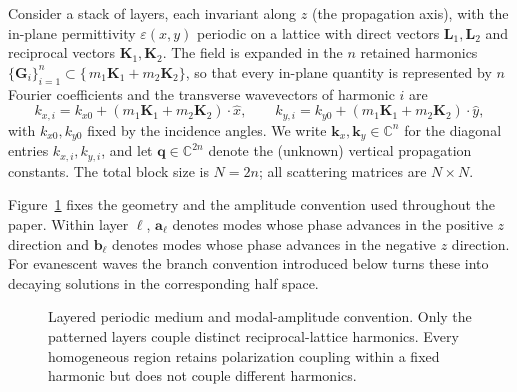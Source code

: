 \documentclass[11pt]{article}
\theoremstyle{remark}
\newcommand{\CC}{\mathbb{C}}
\newcommand{\eps}{\varepsilon}
\newcommand{\kk}{\mathbf{k}}
\newcommand{\fq}{\mathbf{q}}
\newcommand{\fa}{\mathbf{a}}
\newcommand{\fb}{\mathbf{b}}
\begin{document}
Consider a stack of layers, each invariant along $z$ (the propagation axis),
with the in-plane permittivity $\varepsilon(x,y)$ periodic on a lattice with
direct vectors $\mathbf{L}_1,\mathbf{L}_2$ and reciprocal vectors
$\mathbf{K}_1,\mathbf{K}_2$. The field is expanded in the $n$ retained
harmonics
$\{\mathbf{G}_i\}_{i=1}^{n}\subset\{\,m_1\mathbf{K}_1+m_2\mathbf{K}_2\}$,
so that every in-plane quantity is represented by $n$ Fourier coefficients and
the transverse wavevectors of harmonic $i$ are
\begin{equation}
k_{x,i}=k_{x0}+(m_1\mathbf{K}_1+m_2\mathbf{K}_2)\cdot\hat x,\qquad
k_{y,i}=k_{y0}+(m_1\mathbf{K}_1+m_2\mathbf{K}_2)\cdot\hat y,
\label{eq:ks}
\end{equation}
with $k_{x0},k_{y0}$ fixed by the incidence angles. We write
$\kk_x,\kk_y\in\CC^n$ for the diagonal entries $k_{x,i},k_{y,i}$, and let
$\fq\in\CC^{2n}$ denote the (unknown) vertical propagation constants. The total
block size is $N=2n$; all scattering matrices are $N\times N$.

Figure~\ref{fig:geometry} fixes the geometry and the amplitude convention used
throughout the paper.  Within layer $\ell$, $\fa_\ell$ denotes modes whose
phase advances in the positive $z$ direction and $\fb_\ell$ denotes modes
whose phase advances in the negative $z$ direction.  For evanescent waves the
branch convention introduced below turns these into decaying solutions in the
corresponding half space.

\begin{figure}[t]
\centering
{}
\caption{Layered periodic medium and modal-amplitude convention.  Only the
patterned layers couple distinct reciprocal-lattice harmonics.  Every
homogeneous region retains polarization coupling within a fixed harmonic but
does not couple different harmonics.}
\label{fig:geometry}
\end{figure}
\end{document}
